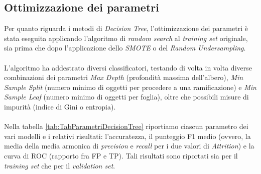 \subsection{Ottimizzazione dei parametri}
Per quanto riguarda i metodi di \textit{Decision Tree}, l’ottimizzazione dei parametri è stata eseguita applicando l’algoritmo di\textit{ random search} al \textit{training set} originale, sia prima che dopo l’applicazione dello \textit{SMOTE} o del \textit{Random Undersampling}. \\\\L’algoritmo ha addestrato diversi classificatori, testando di volta in volta diverse combinazioni dei parametri\textit{ Max Depth} (profondità massima dell’albero), \textit{Min Sample Split} (numero minimo di oggetti per procedere a una ramificazione) e \textit{Min Sample Leaf} (numero minimo di oggetti per foglia), oltre che possibili misure di impurità (indice di Gini o entropia).
\\\\Nella tabella \ref{tab:TabParametriDecisionTree} riportiamo ciascun parametro dei vari modelli e i relativi risultati: l’accuratezza, il punteggio F1 medio (ovvero, la media della media armonica di \textit{precision} e \textit{recall} per i due valori di \textit{Attrition}) e la curva di ROC (rapporto fra FP e TP). Tali risultati sono riportati sia per il \textit{training set} che per il \textit{validation set}.
